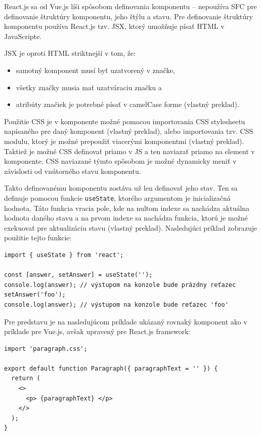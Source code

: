 React.js sa od Vue.js líši spôsobom definovania komponentu -- nepoužíva SFC pre definovanie štruktúry komponentu, jeho štýlu a stavu. Pre definovanie štruktúry komponentu používa React.js tzv. JSX, ktorý umožňuje písať HTML v JavaScripte.

JSX je oproti HTML striktnejší v tom, že:
\begin{itemize}
\item {samotný komponent musí byť uzatvorený v značke,}
\item {všetky značky musia mať uzatváraciu značku a}
\item {atribúty značiek je potrebné písať v camelCase forme \cite{jsx_rules} (vlastný preklad).}
\end{itemize}

Použitie CSS je v komponente možné pomocou importovania CSS stylesheetu napísaného pre daný komponent \cite{reactjs_stylesheet} (vlastný preklad), alebo importovania tzv. CSS modulu, ktorý je možné prepoužiť viacerými komponentmi \cite{reactjs_stylesheet_module} (vlastný preklad). Taktiež je možné CSS definovať priamo v JS a ten naviazať priamo na element v komponente. CSS naviazané týmto spôsobom je možné dynamicky meniť v závislosti od vnútorného stavu komponentu.

Takto definovanému komponentu zostáva už len definovať jeho stav. Ten sa definuje pomocou funkcie \texttt{useState}, ktorého argumentom je inicializačná hodnota. Táto funkcia vracia pole, kde na nultom indexe sa nachádza aktuálna hodnota daného stavu a na prvom indexe sa nachádza funkcia, ktorú je možné exekuovať pre aktualizáciu stavu \cite{react_state} (vlastný preklad). Nasledujúci príklad zobrazuje použitie tejto funkcie:
\begin{verbatim}
import { useState } from 'react';

const [answer, setAnswer] = useState('');
console.log(answer); // výstupom na konzole bude prázdny reťazec
setAnswer('foo');
console.log(answer); // výstupom na konzole bude reťazec 'foo'
\end{verbatim}

Pre predstavu je na nasledujúcom príklade ukázaný rovnaký komponent ako v príklade pre Vue.js, avšak upravený pre React.js framework:
\begin{verbatim}
import 'paragraph.css';

export default function Paragraph({ paragraphText = '' }) {
  return (
    <>
      <p> {paragraphText} </p>
    </>
  );
}
\end{verbatim}

